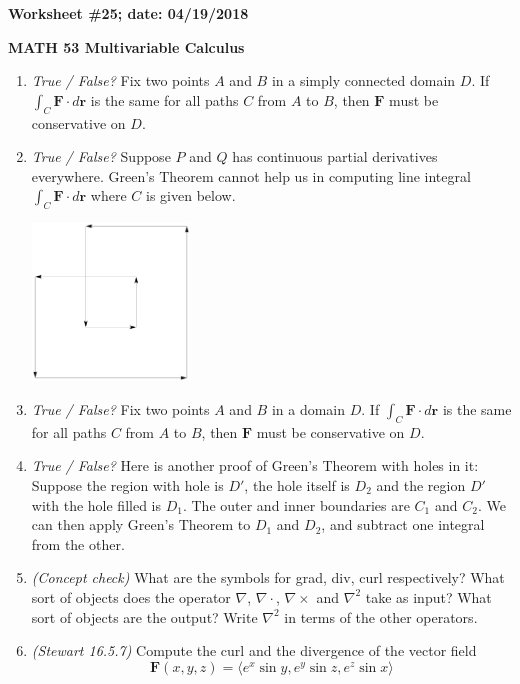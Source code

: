 \documentclass{article}
\newcommand{\rr}{\mathbf{r}}
\begin{document}
{\bf Worksheet \#25; date: 04/19/2018}

{\bf MATH 53 Multivariable Calculus}

\begin{enumerate}
\item {\em True / False?} Fix two points $A$ and $B$ in a simply connected domain $D$. If $\int_C \mathbf{F} \cdot d\rr$ is the same for all paths $C$ from $A$ to $B$, then $\mathbf{F}$ must be conservative on $D$.

\item {\em True / False?} Suppose $P$ and $Q$ has continuous partial derivatives everywhere. Green's Theorem cannot help us in computing line integral $\int_C \mathbf{F} \cdot d\rr$ where $C$ is given below.
\begin{center}
\includegraphics[width=0.33\textwidth]{quiz12dis114pic}
\end{center}

\item {\em True / False?} Fix two points $A$ and $B$ in a domain $D$. If $\int_C \mathbf{F} \cdot d\rr$ is the same for all paths $C$ from $A$ to $B$, then $\mathbf{F}$ must be conservative on $D$.

\item {\em True / False?} Here is another proof of Green's Theorem with holes in it: Suppose the region with hole is $D'$, the hole itself is $D_2$ and the region $D'$ with the hole filled is $D_1$. The outer and inner boundaries are $C_1$ and $C_2$. We can then apply Green's Theorem to $D_1$ and $D_2$, and subtract one integral from the other.

\item {\em (Concept check)} What are the symbols for grad, div, curl respectively? What sort of objects does the operator $\nabla$, $\nabla \cdot$, $\nabla \times$ and $\nabla^2$ take as input? What sort of objects are the output? Write $\nabla^2$ in terms of the other operators.

\item {\em (Stewart 16.5.7)} Compute the curl and the divergence of the vector field
\[
\mathbf{F}(x, y, z) = \langle e^x \sin y, e^y \sin z, e^z \sin x\rangle
\]


\end{enumerate}
\end{document}
